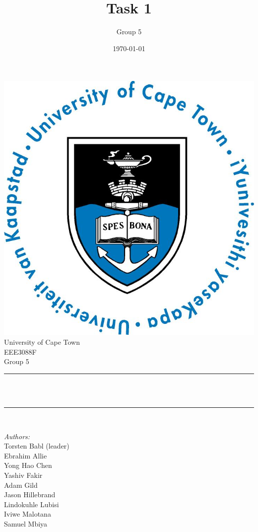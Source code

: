 \documentclass[12pt]{article}
\title{Task 1}								%
\author{Group 5}								%
\date{\today}											%
\makeatletter
\let\thetitle\@title
\makeatother
\begin{document}

\begin{titlepage}
	\centering
    \vspace*{0.5 cm}
    \includegraphics[scale = 0.75]{UCT.jpg}\\[1.0 cm]	%
    \LARGE University of Cape Town\\[1.0 cm]	%
	\Large EEE3088F\\				%
	\large Group 5\\				%
	\rule{\linewidth}{0.2 mm} \\[0.4 cm]
	{ \huge \bfseries \thetitle}\\
	\rule{\linewidth}{0.2 mm} \\[0.5 cm]
	
	\begin{minipage}{0.4\textwidth}
		\begin{flushleft} \large
			\emph{Authors:}\\
      Torsten Babl (leader)\\
      Ebrahim Allie\\
      Yong Hao Chen\\
      Yashiv Fakir\\
      Adam Gild\\
      Jason Hillebrand\\
      Lindokuhle Lubisi\\
      Iviwe Malotana\\
      Samuel Mbiya
      

\end{flushleft}
\end{minipage}
\end{titlepage}
\end{document}
